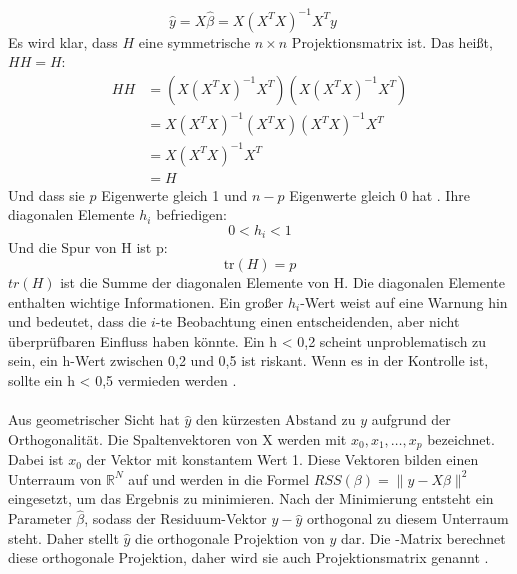 \begin{equation}
\hat{y} = X \hat{\beta} = X(X^T X)^{-1} X^T y \quad 
\label{hutmatrix}
\end{equation}
Es wird klar, dass \(H\) eine symmetrische \( n \times n \) Projektionsmatrix ist. Das heißt, \( HH = H \): 
\begin{equation}
\begin{aligned}
H H &= \left( X (X^T X)^{-1} X^T \right) \left( X (X^T X)^{-1} X^T \right) \\
&= X (X^T X)^{-1} (X^T X) (X^T X)^{-1} X^T \\
&= X (X^T X)^{-1} X^T \\
&= H
\end{aligned}
\label{eq:idempotent}
\end{equation}
Und dass sie \(p\) Eigenwerte gleich 1 und \( n - p \) Eigenwerte gleich 0 hat \cite{huber1981robust}. Ihre diagonalen Elemente \(h_i\) befriedigen:
\begin{equation}
0 < h_i < 1  \label{eq:hi_condition}
\end{equation}
Und die Spur von H ist p: 
\begin{equation}
\text{tr}(H) = p \label{eq:trace_H}
\end{equation}
\(tr(H)\) ist die Summe der diagonalen Elemente von H. Die diagonalen Elemente enthalten wichtige Informationen. Ein großer \(h_i\)-Wert weist auf eine Warnung hin und bedeutet, dass die \(i\)-te Beobachtung einen entscheidenden, aber nicht überprüfbaren Einfluss haben könnte. Ein h < 0,2 scheint unproblematisch zu sein, ein h-Wert zwischen 0,2 und 0,5 ist riskant. Wenn es in der Kontrolle ist, sollte ein h < 0,5 vermieden werden \cite{huber1981robust}. \\\\
Aus geometrischer Sicht hat \(\hat{y}\) den kürzesten Abstand zu \(y\) aufgrund der Orthogonalität. Die Spaltenvektoren von X werden mit \(x_0, x_1, \ldots, x_p\) bezeichnet. Dabei ist \(x_0\) der Vektor mit konstantem Wert 1. Diese Vektoren bilden einen Unterraum von $\mathbb{R}^N$ auf und werden in die Formel \( RSS(\beta) = \|y - X\beta\|^2 \) eingesetzt, um das Ergebnis zu minimieren. Nach der Minimierung entsteht ein Parameter $\hat{\beta}$, sodass der Residuum-Vektor \(y-\hat{y}\) orthogonal zu diesem Unterraum steht. Daher stellt \(\hat{y}\) die orthogonale Projektion von \(y\) dar. Die -Matrix berechnet diese orthogonale Projektion, daher wird sie auch Projektionsmatrix genannt \cite{hastie2009elements}. 
